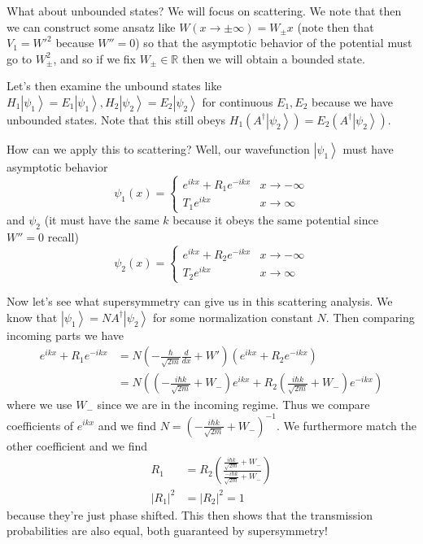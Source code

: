 \documentclass[10pt]{report}
\newcommand{\ket}[1]{\left|#1\right>}
\newcommand{\rd}[2]{\frac{d#1}{d#2}}
\newcommand{\abs}[1]{\left|#1\right|}
\begin{document}
What about unbounded states? We will focus on scattering. We note that then we can construct some ansatz like $W(x \to \pm \infty) = W_{\pm}x$ (note then that $V_1 = W'^2$ because $W'' = 0$) so that the asymptotic behavior of the potential must go to $W_{\pm}^2$, and so if we fix $W_\pm \in \mathbb{R}$ then we will obtain a bounded state.

Let's then examine the unbound states like $H_1\ket{\psi_1} = E_1\ket{\psi_1}, H_2\ket{\psi_2} = E_2\ket{\psi_2}$ for continuous $E_1, E_2$ because we have unbounded states. Note that this still obeys $H_1(A^\dagger \ket{\psi_2}) = E_2(A^\dagger\ket{\psi_2})$.

How can we apply this to scattering? Well, our wavefunction $\ket{\psi_1}$ must have asymptotic behavior
\begin{equation}
    \psi_1(x) =
    \begin{cases}
        e^{ikx} + R_1e^{-ikx} & x \to -\infty\\
        T_1e^{ikx} & x \to \infty
    \end{cases}
\end{equation}
and $\psi_2$ (it must have the same $k$ because it obeys the same potential since $W'' = 0$ recall)
\begin{equation}
    \psi_2(x) =
    \begin{cases}
        e^{ikx} + R_2e^{-ikx} & x \to -\infty\\
        T_2e^{ikx} & x \to \infty
    \end{cases}
\end{equation}

Now let's see what supersymmetry can give us in this scattering analysis. We know that $\ket{\psi_1} = NA^\dagger\ket{\psi_2}$ for some normalization constant $N$. Then comparing incoming parts we have
\begin{align}
    e^{ikx} + R_1e^{-ikx} &= N\left( -\frac{\hbar}{\sqrt{2m}}\rd{}{x} + W' \right)\left( e^{ikx} + R_2e^{-ikx} \right)\\
    &= N\left( \left( -\frac{i\hbar k}{\sqrt{2m}} + W_- \right)e^{ikx} + R_2\left( \frac{i\hbar k}{\sqrt{2m}} + W_- \right)e^{-ikx} \right)
\end{align}
where we use $W_-$ since we are in the incoming regime. Thus we compare coefficients of $e^{ikx}$ and we find $N = \left( -\frac{i\hbar k}{\sqrt{2m}} + W_- \right)^{-1}$. We furthermore match the other coefficient and we find
\begin{align}
    R_1 &= R_2\left( \frac{\frac{i\hbar k}{\sqrt{2m}} + W_-}{\frac{-i\hbar k}{\sqrt{2m}} + W_-} \right)\\
    \abs{R_1}^2 &= \abs{R_2}^2 = 1
\end{align}
because they're just phase shifted. This then shows that the transmission probabilities are also equal, both guaranteed by supersymmetry!
\end{document}
